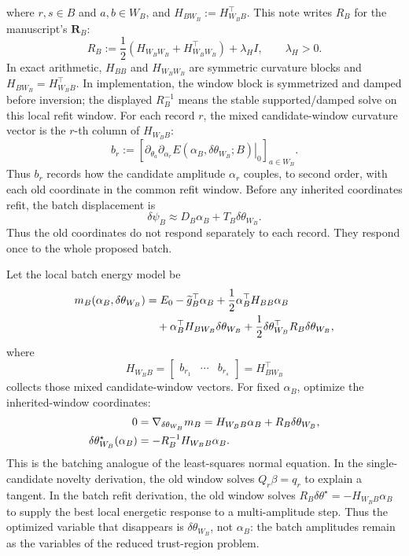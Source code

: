\documentclass[10pt,twocolumn]{article}
\begin{document}
where \(r,s\in B\) and \(a,b\in W_B\), and
\(H_{BW_B}:=H_{W_BB}^{\top}\).  This note writes \(R_B\) for the manuscript's
\(\mathbf R_B\):
\begin{equation}
R_B
:=
\frac12\left(H_{W_BW_B}+H_{W_BW_B}^{\top}\right)
+\lambda_HI,
\qquad
\lambda_H>0.
\label{eq:p1_batch_RB_def}
\end{equation}
In exact arithmetic, \(H_{BB}\) and \(H_{W_BW_B}\) are symmetric curvature
blocks and \(H_{BW_B}=H_{W_BB}^{\top}\).  In implementation, the window block
is symmetrized and damped before inversion; the displayed \(R_B^{-1}\) means
the stable supported/damped solve on this local refit window.
For each record \(r\), the mixed candidate-window curvature vector is the
\(r\)-th column of \(H_{W_BB}\):
\begin{equation}
b_r
:=
\left[
\left.
\partial_{\theta_a}\partial_{\alpha_r}
E(\alpha_B,\delta\theta_{W_B};B)
\right|_{0}
\right]_{a\in W_B}.
\label{eq:p1_batch_br_def}
\end{equation}
Thus \(b_r\) records how the candidate amplitude \(\alpha_r\) couples, to
second order, with each old coordinate in the common refit window.
Before any inherited coordinates refit, the batch displacement is
\begin{equation}
\delta\psi_B
\approx
D_B\alpha_B+T_B\delta\theta_{W_B}.
\label{eq:p1_batch_state_step}
\end{equation}
Thus the old coordinates do not respond separately to each record.  They
respond once to the whole proposed batch.

Let the local batch energy model be
\begin{align}
m_B(\alpha_B,\delta\theta_{W_B})
&=E_0-\widetilde g_B^\top\alpha_B
+\frac12\alpha_B^\top H_{BB}\alpha_B
\notag\\
&\quad
+\alpha_B^\top H_{BW_B}\delta\theta_{W_B}
	+\frac12\delta\theta_{W_B}^\top R_B\delta\theta_{W_B},
\label{eq:p1_batch_model}
\end{align}
where
\[
H_{W_BB}
=
\begin{bmatrix}b_{r_1}&\cdots&b_{r_s}\end{bmatrix}
=H_{BW_B}^\top
\]
collects those mixed candidate-window vectors.  For fixed \(\alpha_B\),
optimize the inherited-window coordinates:
\begin{align}
0
&=\nabla_{\delta\theta_{W_B}}m_B
=H_{W_BB}\alpha_B+R_B\delta\theta_{W_B},
\notag\\
\delta\theta_{W_B}^\star(\alpha_B)
&=-R_B^{-1}H_{W_BB}\alpha_B.
\label{eq:p1_batch_window_star}
\end{align}
This is the batching analogue of the least-squares normal equation.  In the
single-candidate novelty derivation, the old window solves \(Q_r\beta=q_r\) to
explain a tangent.  In the batch refit derivation, the old window solves
\(R_B\delta\theta^\star=-H_{W_BB}\alpha_B\) to supply the best local energetic
response to a multi-amplitude step.  Thus the optimized variable that
disappears is \(\delta\theta_{W_B}\), not \(\alpha_B\): the batch amplitudes
remain as the variables of the reduced trust-region problem.
\end{document}
